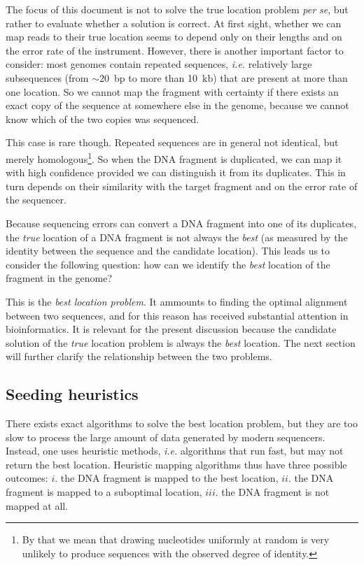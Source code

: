 \documentclass{article}
\begin{document}
The focus of this document is not to solve the true location problem
\textit{per se}, but rather to evaluate whether a solution is correct. At
first sight, whether we can map reads to their true location seems to
depend only on their lengths and on the error rate of the instrument.
However, there is another important factor to consider: most genomes
contain repeated sequences, \textit{i.e.} relatively large subsequences
(from $\sim20$~bp to more than 10~kb) that are present at more than one
location. So we cannot map the fragment with certainty if there exists an
exact copy of the sequence at somewhere else in the genome, because we
cannot know which of the two copies was sequenced.

This case is rare though. Repeated sequences are in general not identical,
but merely homologous\footnote{By that we mean that drawing nucleotides
uniformly at random is very unlikely to produce sequences with the
observed degree of identity.}. So when the DNA fragment is duplicated, we
can map it with high confidence provided we can distinguish it from its
duplicates. This in turn depends on their similarity with the target
fragment and on the error rate of the sequencer.

Because sequencing errors can convert a DNA fragment into one of its
duplicates, the \emph{true} location of a DNA fragment is not always the
\emph{best} (as measured by the identity between the sequence and the
candidate location). This leads us to consider the following question: how
can we identify the \emph{best} location of the fragment in the genome? 

This is the \emph{best location problem}. It ammounts to finding the
optimal alignment between two sequences, and for this reason has received
substantial attention in bioinformatics. It is relevant for the present
discussion because the candidate solution of the \emph{true} location
problem is always the \emph{best} location. The next section will further
clarify the relationship between the two problems.


\subsection{Seeding heuristics}
\label{sec:seedheur}

There exists exact algorithms to solve the best location
problem\cite{pmid7265238,pmid5420325}, but they are too slow to process
the large amount of data generated by modern sequencers. Instead, one uses
heuristic methods, \textit{i.e.} algorithms that run fast, but may not
return the best location\cite{Waterman1984}. Heuristic mapping algorithms
thus have three possible outcomes: $i.$ the DNA fragment is mapped to the
best location, $ii.$ the DNA fragment is mapped to a suboptimal location,
$iii.$ the DNA fragment is not mapped at all.
\end{document}
